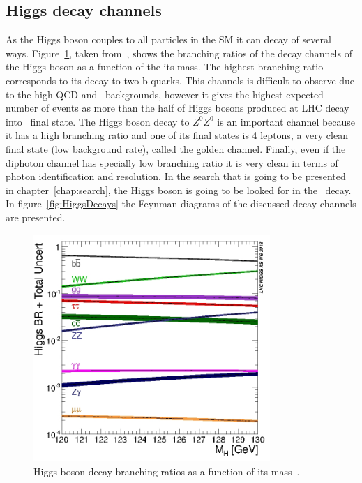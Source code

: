 \subsection{Higgs decay channels}

As the Higgs boson couples to all particles in the SM it can decay of several ways. Figure~\ref{fig:HiggsBrs}, taken from~\cite{Dittmaier:2011ti, Dittmaier:2012vm, Heinemeyer:2013tqa, HIGGSXSWG}, shows the branching ratios of the decay channels of the Higgs boson as a function of the its mass. The highest branching ratio corresponds to its decay to two b-quarks. This channels is difficult to observe due to the high QCD and \ttbar~backgrounds, however it gives the highest expected number of events as more than the half of Higgs bosons produced at LHC decay into \bbbar~final state. The Higgs boson decay to $Z^{0}Z^{0}$ is an important channel because it has a high branching ratio and one of its final states is 4 leptons, a very clean final state (low background rate), called the golden channel. Finally, even if the diphoton channel has specially low branching ratio it is very clean in terms of photon identification and resolution. In the search that is going to be presented in chapter~\ref{chap:search}, the Higgs boson is going to be looked for in the \bbbar~decay. In figure~\ref{fig:HiggsDecays} the Feynman diagrams of the discussed decay channels are presented.

\begin{figure}[!Hhtbp]
  \begin{center}
    \includegraphics[width=0.8\textwidth]{figs/Higgs_BR_120-130.jpg}
    \caption{Higgs boson decay branching ratios as a function of its mass~\cite{Dittmaier:2011ti, Dittmaier:2012vm, Heinemeyer:2013tqa, HIGGSXSWG}.}
    \label{fig:HiggsBrs}
  \end{center}
\end{figure}

